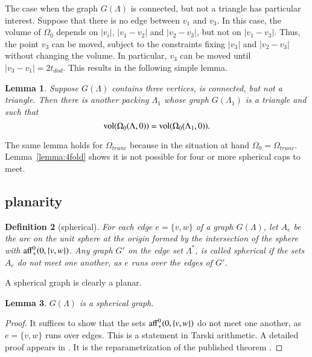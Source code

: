 \documentclass{article} %
\newtheorem{lemma}{Lemma}[subsection]
\newtheorem{definition}[lemma]{Definition}
\begin{document}
The case when the graph $G(\Lambda)$ is connected, but not a triangle
has particular interest.  Suppose that there is no edge between
$v_1$ and $v_3$. In this case, the volume of $\Omega_0$ depends on
$|v_i|$, $|v_1-v_2|$ and $|v_2-v_3|$, but not on $|v_1-v_3|$.
Thus, the point $v_3$ can be moved, subject to the constraints
fixing $|v_3|$ and $|v_2-v_3|$ without changing the volume.
In particular, $v_3$ can be moved until $|v_3-v_1|=2t_{dod}$.  This
results in the following simple lemma.  

\begin{lemma}\label{lemma:3tri}  
Suppose $G(\Lambda)$ contains three vertices,
is connected, but not a triangle.  Then there is another packing
$\Lambda_1$ whose graph $G(\Lambda_1)$ is a triangle and such
that
  $$
  {\operatorname{vol}}(\Omega_0(\Lambda,0)) = {\operatorname{vol}}(\Omega_0(\Lambda_1,0)).
  $$
\end{lemma}

The same lemma holds
for $\Omega_{trunc}$ because in the situation at hand $\Omega_0=\Omega_{trunc}$.
Lemma~\ref{lemma:4fold} shows it is not possible for four or more
spherical caps to meet.

\subsection{planarity}

\begin{definition}[spherical]
For each edge $e=\{v,w\}$ of a graph $G(\Lambda)$,
let $A_e$ be the arc on the unit sphere at the origin formed
by the intersection of the sphere with ${\operatorname{aff}}^0_+(0,\{v,w\})$.
Any graph $G'$ on the edge set $\Lambda^*$, is called
{\it spherical} if the sets $A_e$ do not meet one
another, as $e$ runs over the edges of $G'$.  
\end{definition}

A spherical graph is clearly a planar.

\begin{lemma}\label{lemma:planar}  
$G(\Lambda)$ is a spherical graph.
\end{lemma}

\begin{proof}  It suffices to show that the sets
${\operatorname{aff}}^0_+(0,\{v,w\})$ do not meet one another, as $e=\{v,w\}$
runs over edges.  This is a statement in Tarski arithmetic.
A detailed proof appears in \cite[Lemma~3.2]{arx}.  
It is the reparametrization
of the published theorem \cite[Lemma~3.10]{Part1}.
\end{proof}
\end{document}
